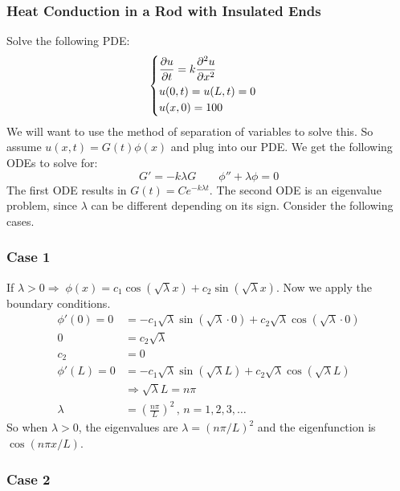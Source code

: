 \documentclass{article}
\begin{document}
	\subsubsection{Heat Conduction in a Rod with Insulated Ends}
	
	\begin{eg}
		Solve the following PDE:
		\[
			\begin{cases}
				\dfrac{\partial u}{\partial t} = k\dfrac{\partial^2 u}{\partial x^2} \vspace{1mm} \\
				u(0,t) = u(L,t) = 0 \\
				u(x,0) = 100
			\end{cases}
		\]
		We will want to use the method of separation of variables to solve this. So assume $ u(x,t) = G(t) \phi(x) $ and plug into our PDE. We get the following ODEs to solve for:
		\[
			G' = -k\lambda G \qquad \phi'' + \lambda \phi = 0 
		\]
		The first ODE results in $ G(t) = Ce^{-k \lambda t} $. The second ODE is an eigenvalue problem, since $ \lambda $ can be different depending on its sign. Consider the following cases.
		
		\subsubsection*{Case 1}
		
		If $ \lambda > 0 \Rightarrow \; \phi(x) = c_1 \cos(\sqrt{\lambda} x) + c_2 \sin(\sqrt{\lambda} x) $. Now we apply the boundary conditions.
		\begin{align*}
			\phi'(0) = 0 &= -c_1\sqrt{\lambda}\sin(\sqrt{\lambda} \cdot 0) + c_2\sqrt{\lambda}\cos(\sqrt{\lambda} \cdot 0) \\
			0 &= c_2\sqrt{\lambda} \\
			c_2 &= 0 \\
			\phi'(L) = 0 &= -c_1\sqrt{\lambda}\sin(\sqrt{\lambda} L) + c_2\sqrt{\lambda}\cos(\sqrt{\lambda} L) \\
			&\Rightarrow \sqrt{\lambda} L = n\pi \\
			\lambda&= \left( \frac{n\pi}{L} \right)^2 \, , \, n = 1,2,3,\dots
		\end{align*}
	So when $ \lambda > 0 $, the eigenvalues are $ \lambda = (n\pi/L)^2 $ and the eigenfunction is $ \cos(n\pi x/L) $.
	
	\subsubsection*{Case 2}
	

\end{eg}
\end{document}
